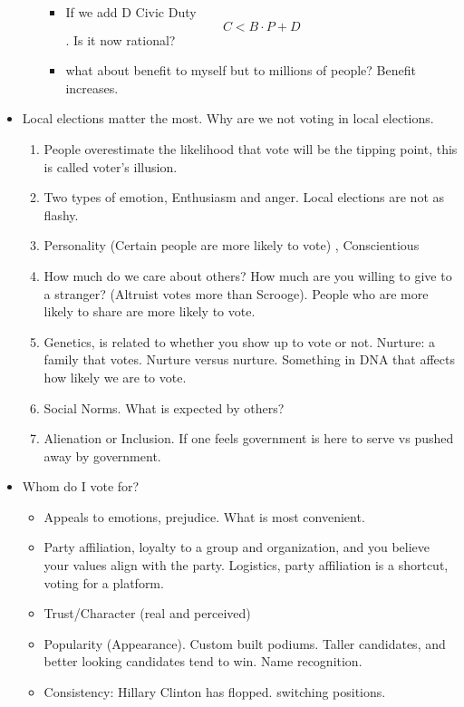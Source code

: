 \documentclass{article}
\begin{document}
\begin{itemize}
\begin{itemize}
\begin{itemize}
            \item If we add D Civic Duty $$C < B\cdot P + D$$. Is it now rational? 
            \item what about benefit to myself but to millions of people? Benefit increases. 
        \end{itemize}
    \end{itemize}
    \item Local elections matter the most. Why are we not voting in local elections.
    \begin{enumerate}
        \item People overestimate the likelihood that vote will be the tipping point, this is called voter's illusion. 
        \item Two types of emotion, Enthusiasm and anger. Local elections are not as flashy. 
        \item Personality (Certain people are more likely to vote) , Conscientious
        \item How much do we care about others? How much are you willing to give to a stranger? (Altruist votes more than Scrooge). People who are more likely to share are more likely to vote.
        \item Genetics, is related to whether you show up to vote or not. Nurture: a family that votes. Nurture versus nurture. Something in DNA that affects how likely we are to vote. 
        \item Social Norms. What is expected by others? 
        \item Alienation or Inclusion. If one feels government is here to serve vs pushed away by government. 
    \end{enumerate}
    \item Whom do I vote for? 
    \begin{itemize}
        \item Appeals to emotions, prejudice. What is most convenient. 
        \item Party affiliation, loyalty to a group and organization, and you believe your values align with the party. Logistics, party affiliation is a shortcut, voting for a platform. 
        \item Trust/Character (real and perceived)
        \item Popularity (Appearance). Custom built podiums. Taller candidates, and better looking candidates tend to win. Name recognition. 
        \item Consistency: Hillary Clinton has flopped. switching positions.

\end{itemize}
\end{itemize}
\end{document}
